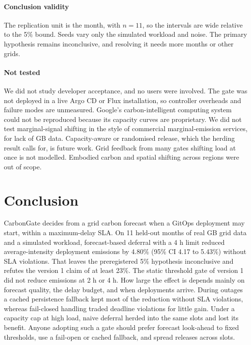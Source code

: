 \documentclass[journal]{IEEEtran}
\begin{document}
\paragraph{Conclusion validity} The replication unit is the month, with $n = 11$, so the intervals are wide relative to the 5\% bound. Seeds vary only the simulated workload and noise. The primary hypothesis remains inconclusive, and resolving it needs more months or other grids.

\paragraph{Not tested} We did not study developer acceptance, and no users were involved. The gate was not deployed in a live Argo CD or Flux installation, so controller overheads and failure modes are unmeasured. Google's carbon-intelligent computing system \cite{radovanovic2023carbon} could not be reproduced because its capacity curves are proprietary. We did not test marginal-signal shifting in the style of commercial marginal-emission services, for lack of GB data. Capacity-aware or randomised release, which the herding result calls for, is future work. Grid feedback from many gates shifting load at once is not modelled. Embodied carbon and spatial shifting across regions were out of scope.

\section{Conclusion}
\label{sec:conclusion}
CarbonGate decides from a grid carbon forecast when a GitOps deployment may start, within a maximum-delay SLA. On 11 held-out months of real GB grid data and a simulated workload, forecast-based deferral with a 4 h limit reduced average-intensity deployment emissions by 4.80\% (95\% CI 4.17 to 5.43\%) without SLA violations. That leaves the preregistered 5\% hypothesis inconclusive and refutes the version 1 claim of at least 23\%. The static threshold gate of version 1 did not reduce emissions at 2 h or 4 h. How large the effect is depends mainly on forecast quality, the delay budget, and when deployments arrive. During outages a cached persistence fallback kept most of the reduction without SLA violations, whereas fail-closed handling traded deadline violations for little gain. Under a capacity cap at high load, naive deferral herded into the same slots and lost its benefit. Anyone adopting such a gate should prefer forecast look-ahead to fixed thresholds, use a fail-open or cached fallback, and spread releases across slots.
\end{document}
